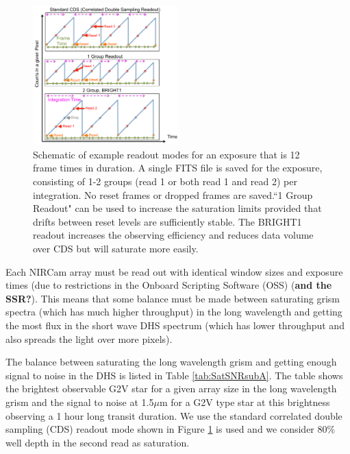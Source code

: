 \documentclass{emulateapj}
\begin{document}
\begin{figure}
\centering
\includegraphics[width=0.5\textwidth]{readout_schematic.pdf}
\caption{Schematic of example readout modes for an exposure that is 12 frame times in duration. A single FITS file is saved for the exposure, consisting of 1-2 groups (read 1 or both read 1 and read 2) per integration. No reset frames or dropped frames are saved.``1 Group Readout" can be used to increase the saturation limits provided that drifts between reset levels are sufficiently stable. The BRIGHT1 readout increases the observing efficiency and reduces data volume over CDS but will saturate more easily. }\label{fig:readout}
\end{figure}

Each NIRCam array must be read out with identical window sizes and exposure times (due to restrictions in the Onboard Scripting Software (OSS) (\textbf{and the SSR?}). This means that some balance must be made between saturating grism spectra (which has much higher throughput) in the long wavelength and getting the most flux in the short wave DHS spectrum (which has lower throughput and also spreads the light over more pixels).

The balance between saturating the long wavelength grism and getting enough signal to noise in the DHS is listed in Table \ref{tab:SatSNRsubA}. The table shows the brightest observable G2V star  for a given array size in the long wavelength grism and the signal to noise at 1.5$\mu$m for a G2V type star at this brightness observing a 1 hour long transit duration. We use the standard correlated double sampling (CDS) readout mode shown in Figure \ref{fig:readout} is used and we consider 80\% well depth in the second read as saturation.
\end{document}
